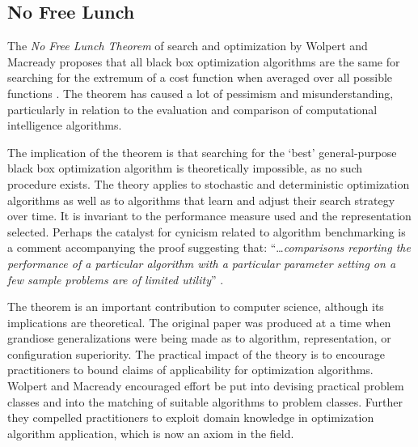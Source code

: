 \documentclass[a4paper, 11pt]{article}
\begin{document}
% 
% 
\subsection{No Free Lunch}
\label{subsec:nfl}
The \emph{No Free Lunch Theorem} of search and optimization by Wolpert and Macready proposes that all black box optimization algorithms are the same for searching for the extremum of a cost function when averaged over all possible functions \cite{Wolpert1997, Wolpert1995}. The theorem has caused a lot of pessimism and misunderstanding, particularly in relation to the evaluation and comparison of computational intelligence algorithms.

The implication of the theorem is that searching for the `best' general-purpose black box optimization algorithm is theoretically impossible, as no such procedure exists. The theory applies to stochastic and deterministic optimization algorithms as well as to algorithms that learn and adjust their search strategy over time. It is invariant to the performance measure used and the representation selected. Perhaps the catalyst for cynicism related to algorithm benchmarking is a comment accompanying the proof suggesting that: ``\ldots \emph{comparisons reporting the performance of a particular algorithm with a particular parameter setting on a few sample problems are of limited utility}'' \cite{Wolpert1997}.

The theorem is an important contribution to computer science, although its implications are theoretical. The original paper was produced at a time when grandiose generalizations were being made as to algorithm, representation, or configuration superiority. The practical impact of the theory is to encourage practitioners to bound claims of applicability for optimization algorithms. Wolpert and Macready encouraged effort be put into devising practical problem classes and into the matching of suitable algorithms to problem classes. Further they compelled practitioners to exploit domain knowledge in optimization algorithm application, which is now an axiom in the field.

% 
% 
\end{document}
